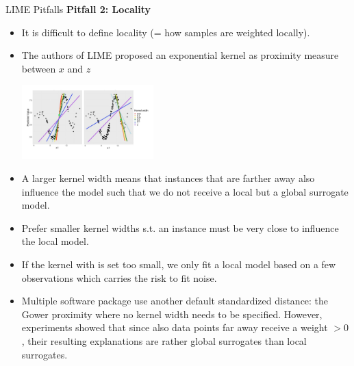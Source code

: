 \documentclass[aspectratio=169]{../latex_main/tntbeamer}  %
\begin{document}
\begin{frame}{LIME Pitfalls }
\vspace{-2em}
	\textbf{Pitfall 2: Locality}
	\begin{itemize} 
     \item It is difficult to define locality (= how samples are weighted locally). %
     \item The authors of LIME proposed an exponential kernel as proximity measure between $x$ and $z$
     	 \begin{center}
     		\includegraphics[width=0.4\textwidth]{figure/lime_locality}
     	\end{center}
     \item A larger kernel width means that instances that are farther away also influence the model such that we do not receive a local but a global surrogate model. 
     \item Prefer smaller kernel widths s.t. an instance must be very close to influence the local model.  
     \item If the kernel with is set too small, we only fit a local model based on a few observations which carries the risk to fit noise.   
	\item Multiple software package use another default standardized distance: the Gower proximity where no kernel width needs to be specified. However, experiments showed that since also data points far away receive a weight $ > 0$, their resulting explanations are rather global surrogates than local surrogates.   
\end{itemize}

\end{frame}
\end{document}
